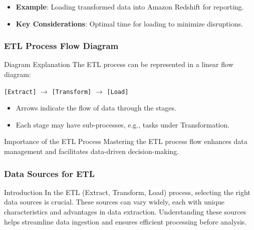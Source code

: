 \documentclass[aspectratio=169]{beamer}
\begin{document}
\begin{frame}[fragile]
\begin{enumerate}
\begin{itemize}
\begin{itemize}
                        \item Full Load: Complete replacement of data in the target.
                        \item Incremental Load: Only new or updated data is added.
                    \end{itemize}
                \item \textbf{Example}: Loading transformed data into Amazon Redshift for reporting.
                \item \textbf{Key Considerations}: Optimal time for loading to minimize disruptions.
            \end{itemize}
    \end{enumerate}
\end{frame}

\begin{frame}[fragile]
    \frametitle{ETL Process Flow Diagram}
    \begin{block}{Diagram Explanation}
        The ETL process can be represented in a linear flow diagram:
        \begin{center}
            \texttt{[Extract]} $\rightarrow$ \texttt{[Transform]} $\rightarrow$ \texttt{[Load]}
        \end{center}
        \begin{itemize}
            \item Arrows indicate the flow of data through the stages.
            \item Each stage may have sub-processes, e.g., tasks under Transformation.
        \end{itemize}
    \end{block}
    \begin{block}{Importance of the ETL Process}
        Mastering the ETL process flow enhances data management and facilitates data-driven decision-making.
    \end{block}
\end{frame}

\begin{frame}[fragile]
    \frametitle{Data Sources for ETL}
    \begin{block}{Introduction}
        In the ETL (Extract, Transform, Load) process, selecting the right data sources is crucial. 
        These sources can vary widely, each with unique characteristics and advantages in data extraction. 
        Understanding these sources helps streamline data ingestion and ensures efficient processing before analysis.
    \end{block}
\end{frame}
\end{document}
